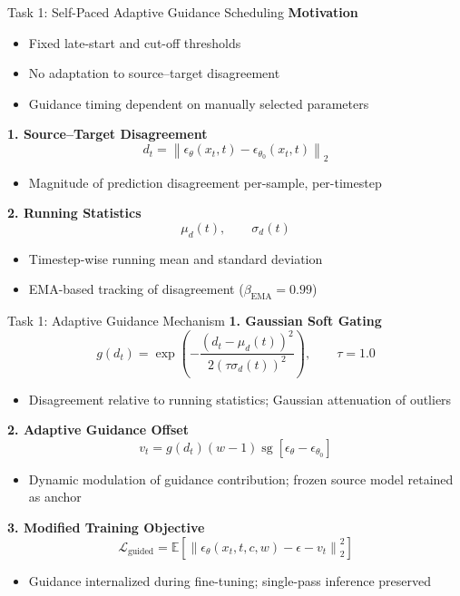 \documentclass[aspectratio=169]{beamer}
\begin{document}
\begin{frame}{Task 1: Self-Paced Adaptive Guidance Scheduling}
    \textbf{Motivation}
    \begin{itemize}
        \item Fixed late-start and cut-off thresholds
        \item No adaptation to source--target disagreement
        \item Guidance timing dependent on manually selected parameters
    \end{itemize}

    \vspace{0.15cm}
    \textbf{1. Source--Target Disagreement}
    \[
    d_t = \left\| \epsilon_\theta(x_t, t) - \epsilon_{\theta_0}(x_t, t) \right\|_2
    \]
    \begin{itemize}
        \item Magnitude of prediction disagreement per-sample, per-timestep
    \end{itemize}

    \vspace{0.1cm}
    \textbf{2. Running Statistics}
    \[
    \mu_d(t), \qquad \sigma_d(t)
    \]
    \begin{itemize}
        \item Timestep-wise running mean and standard deviation
        \item EMA-based tracking of disagreement ($\beta_{\text{EMA}} = 0.99$)
    \end{itemize}
\end{frame}

\begin{frame}{Task 1: Adaptive Guidance Mechanism}
    \textbf{1. Gaussian Soft Gating}
    \[
    g(d_t) = \exp\left( -\frac{(d_t - \mu_d(t))^2}{2(\tau \sigma_d(t))^2} \right), \qquad \tau = 1.0
    \]
    \begin{itemize}
        \item Disagreement relative to running statistics; Gaussian attenuation of outliers
    \end{itemize}

    \vspace{0.1cm}
    \textbf{2. Adaptive Guidance Offset}
    \[
    v_t = g(d_t)(w - 1)\operatorname{sg}[\epsilon_\theta - \epsilon_{\theta_0}]
    \]
    \begin{itemize}
        \item Dynamic modulation of guidance contribution; frozen source model retained as anchor
    \end{itemize}

    \vspace{0.1cm}
    \textbf{3. Modified Training Objective}
    \[
    \mathcal{L}_{\text{guided}} = \mathbb{E}\left[ \left\| \epsilon_\theta(x_t, t, c, w) - \epsilon - v_t \right\|_2^2 \right]
    \]
    \begin{itemize}
        \item Guidance internalized during fine-tuning; single-pass inference preserved
    \end{itemize}
\end{frame}
\end{document}

